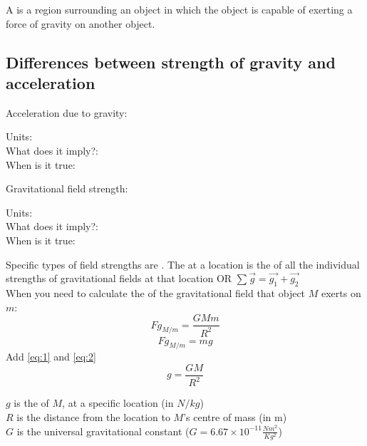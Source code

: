 A  is a region surrounding an object in which the object is capable of exerting a force of gravity 
on another object.

\subsection{Differences between strength of gravity and acceleration}
Acceleration due to gravity:
\begin{center}
    Units: \\
    What does it imply?:  \\
    When is it true: 
\end{center}

Gravitational field strength:
\begin{center}
    Units: \\
    What does it imply?:  \\
    When is it true: 
\end{center}

Specific types of field strengths are . The  at a location is the 
of all the individual strengths of gravitational fields at that location OR $\sum \vec{g} = \vec{g_{1}} + \vec{g_{2}}$\\

When you need to calculate the  of the gravitational field that object $M$ exerts on $m$:
\begin{equation} \label{eq:1}
    Fg_{M/m} = \frac{GMm}{R^2}
\end{equation}
\begin{equation} \label{eq:2}
    Fg_{M/m} = mg
\end{equation}
Add \ref{eq:1} and \ref{eq:2}
\begin{equation}
    g = \frac{GM}{R^2}
\end{equation}
\begin{center}
    $g$ is the  of $M$, at a specific location (in $N/kg$)\\
    $R$ is the distance from the location to $M$'s centre of mass (in m)\\
    $G$ is the universal gravitational constant ($G = 6.67\times 10^{-11}\frac{Nm^2}{Kg^2}$)
\end{center}
